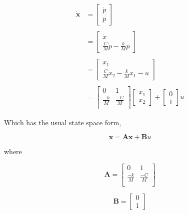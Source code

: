 \begin{align*}
    \mathbf{\dot{x}}
    &=
    \begin{bmatrix}
        \dot{p} \\
        \ddot{p}
    \end{bmatrix} \\ \\ 
    &=
    \begin{bmatrix}
        \dot{x} \\
        \frac{C}{M}\dot{p} - \frac{k}{M}p
    \end{bmatrix} \\ \\ 
    &=
    \begin{bmatrix}
        x_{1} \\
        \frac{C}{M}x_{2} - \frac{k}{M}x_{1} - u
    \end{bmatrix} \\ \\
    &=
    \begin{bmatrix}
        0 & 1\\
        \frac{-k}{M} & \frac{-C}{M} \\
    \end{bmatrix}
    \begin{bmatrix}
        x_{1} \\
        x_{2}
    \end{bmatrix}
    +
    \begin{bmatrix}
        0 \\
        1
    \end{bmatrix}
    u
\end{align*}

Which has the usual state space form,

\begin{equation}\label{eq:sys-ss}
\mathbf{\dot{x}} = \mathbf{A}\mathbf{x} + \mathbf{B}u
\end{equation}

where

\begin{equation*}
    \mathbf{A} =
    \begin{bmatrix}
        0 & 1\\
        \frac{-k}{M} & \frac{-C}{M} \\
    \end{bmatrix}
    \end{equation*}

    \begin{equation*}
    \mathbf{B} =
    \begin{bmatrix}
        0 \\
        1
    \end{bmatrix}
\end{equation*}

